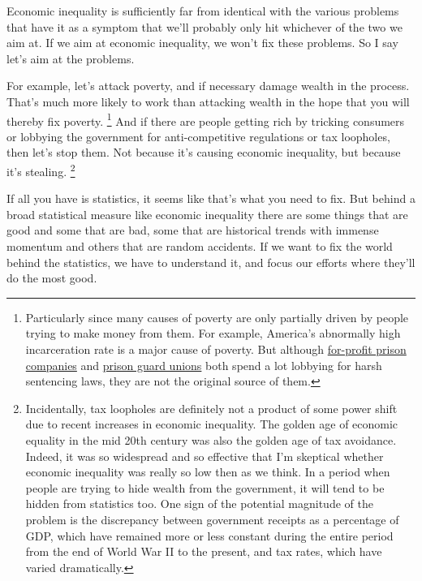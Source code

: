 \documentclass[12pt]{book}
\begin{document}
Economic inequality is sufficiently far from identical with the various
problems that have it as a symptom that we'll probably only hit
whichever of the two we aim at. If we aim at economic inequality, we
won't fix these problems. So I say let's aim at the problems.

For example, let's attack poverty, and if necessary damage wealth in the
process. That's much more likely to work than attacking wealth in the
hope that you will thereby fix poverty. \footnote{Particularly since many causes of poverty are only partially
driven by people trying to make money from them. For example, America's
abnormally high incarceration rate is a major cause of poverty. But
although
\href{https://www.washingtonpost.com/posteverything/wp/2015/04/28/how-for-profit-prisons-have-become-the-biggest-lobby-no-one-is-talking-about/}{for-profit
prison companies} and
\href{http://mic.com/articles/41531/union-of-the-snake-how-california-s-prison-guards-subvert-democracy}{prison
guard unions} both spend a lot lobbying for harsh sentencing laws, they
are not the original source of them.} And if
there are people getting rich by tricking consumers or lobbying the
government for anti-competitive regulations or tax loopholes, then let's
stop them. Not because it's causing economic inequality, but because
it's stealing. \footnote{Incidentally, tax loopholes are definitely not a product of
some power shift due to recent increases in economic inequality. The
golden age of economic equality in the mid 20th century was also the
golden age of tax avoidance. Indeed, it was so widespread and so
effective that I'm skeptical whether economic inequality was really so
low then as we think. In a period when people are trying to hide wealth
from the government, it will tend to be hidden from statistics too. One
sign of the potential magnitude of the problem is the discrepancy
between government receipts as a percentage of GDP, which have remained
more or less constant during the entire period from the end of World War
II to the present, and tax rates, which have varied dramatically.}

If all you have is statistics, it seems like that's what you need to
fix. But behind a broad statistical measure like economic inequality
there are some things that are good and some that are bad, some that are
historical trends with immense momentum and others that are random
accidents. If we want to fix the world behind the statistics, we have to
understand it, and focus our efforts where they'll do the most good.
\end{document}
